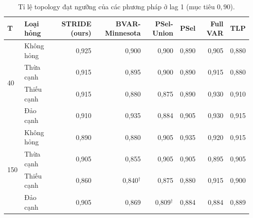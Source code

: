 \begin{table}[H]
\centering
\caption{Tỉ lệ topology đạt ngưỡng của các phương pháp ở lag 1 (mục tiêu $0{,}90$).}\label{tab:cmp-hit}
{\small
\begin{tabular}{llrrrrrr}
\toprule
T & Loại hỏng & STRIDE (ours) & BVAR-Minnesota & PSel-Union & PSel & Full VAR & TLP \\
\midrule
\multirow{4}{*}{40} & Không hỏng & 0,925 & 0,900 & 0,900 & 0,890 & 0,905 & 0,880 \\
 & Thừa cạnh & 0,915 & 0,895 & 0,900 & 0,890 & 0,915 & 0,880 \\
 & Thiếu cạnh & 0,915 & 0,880 & 0,875 & 0,890 & 0,930 & 0,910 \\
 & Đảo cạnh & 0,910 & 0,935 & 0,884 & 0,905 & 0,930 & 0,915 \\
\midrule
\multirow{4}{*}{150} & Không hỏng & 0,890 & 0,880 & 0,905 & 0,935 & 0,920 & 0,915 \\
 & Thừa cạnh & 0,905 & 0,855 & 0,905 & 0,905 & 0,895 & 0,905 \\
 & Thiếu cạnh & 0,860 & 0,840$^{\dagger}$ & 0,875 & 0,880 & 0,915 & 0,900 \\
 & Đảo cạnh & 0,905 & 0,869 & 0,809$^{\dagger}$ & 0,884 & 0,884 & 0,889 \\
\bottomrule
\end{tabular}
}
\end{table}
